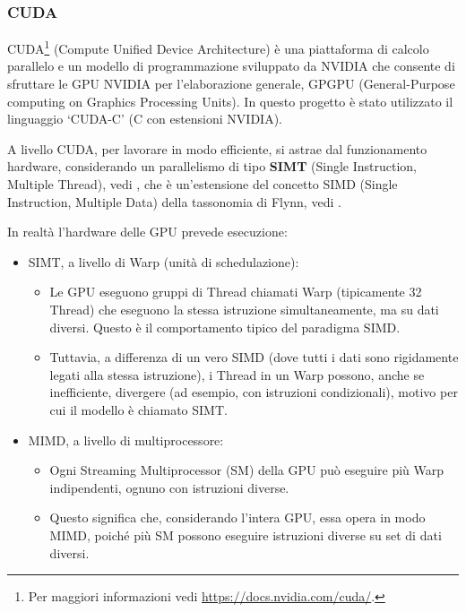 \documentclass[12pt,a4paper]{report}
\begin{document}
\subsubsection{CUDA}

CUDA\footnote{Per maggiori informazioni vedi \url{https://docs.nvidia.com/cuda/}.} (Compute Unified Device Architecture) è una
piattaforma di calcolo parallelo e un modello di programmazione sviluppato da NVIDIA che consente di sfruttare le GPU NVIDIA per
l'elaborazione generale, GPGPU (General-Purpose computing on Graphics Processing Units).
In questo progetto è stato utilizzato il linguaggio `CUDA-C' (C con estensioni NVIDIA).

A livello CUDA, per lavorare in modo efficiente, si astrae dal funzionamento hardware, considerando un parallelismo di tipo
\textbf{SIMT} (Single Instruction, Multiple Thread), vedi \cite{NVIDIA2008}, che è un'estensione del concetto SIMD (Single
Instruction, Multiple Data) della tassonomia di Flynn, vedi \cite{Flynn1966}.

In realtà l'hardware delle GPU prevede esecuzione:
\begin{itemize}
  \item SIMT, a livello di Warp (unità di schedulazione):
        \begin{itemize}
          \item Le GPU eseguono gruppi di Thread chiamati Warp (tipicamente 32 Thread) che eseguono la stessa istruzione
                simultaneamente, ma su dati diversi. Questo è il comportamento tipico del paradigma SIMD.
          \item Tuttavia, a differenza di un vero SIMD (dove tutti i dati sono rigidamente legati alla stessa istruzione), i
                Thread in un Warp possono, anche se inefficiente, divergere (ad esempio, con istruzioni condizionali), motivo per
                cui il modello è chiamato SIMT.
        \end{itemize}
  \item MIMD, a livello di multiprocessore:
        \begin{itemize}
          \item Ogni Streaming Multiprocessor (SM) della GPU può eseguire più Warp indipendenti, ognuno con istruzioni diverse.
          \item Questo significa che, considerando l'intera GPU, essa opera in modo MIMD, poiché più SM possono eseguire
                istruzioni diverse su set di dati diversi.
        \end{itemize}
\end{itemize}
\end{document}
